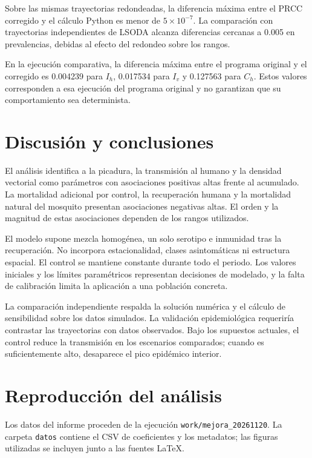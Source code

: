\documentclass[12pt,spanish,oneside,openany]{MastersDoctoralThesis}
\numberwithin{equation}{section}
\begin{document}
Sobre las mismas trayectorias redondeadas, la diferencia máxima entre el PRCC corregido y el cálculo Python es menor de $5\times10^{-7}$. La comparación con trayectorias independientes de LSODA alcanza diferencias cercanas a 0.005 en prevalencias, debidas al efecto del redondeo sobre los rangos.

En la ejecución comparativa, la diferencia máxima entre el programa original y el corregido es 0.004239 para $I_h$, 0.017534 para $I_v$ y 0.127563 para $C_h$. Estos valores corresponden a esa ejecución del programa original y no garantizan que su comportamiento sea determinista.

\clearpage
\section{Discusión y conclusiones}
El análisis identifica a la picadura, la transmisión al humano y la densidad vectorial como parámetros con asociaciones positivas altas frente al acumulado. La mortalidad adicional por control, la recuperación humana y la mortalidad natural del mosquito presentan asociaciones negativas altas. El orden y la magnitud de estas asociaciones dependen de los rangos utilizados.

El modelo supone mezcla homogénea, un solo serotipo e inmunidad tras la recuperación. No incorpora estacionalidad, clases asintomáticas ni estructura espacial. El control se mantiene constante durante todo el periodo. Los valores iniciales y los límites paramétricos representan decisiones de modelado, y la falta de calibración limita la aplicación a una población concreta.

La comparación independiente respalda la solución numérica y el cálculo de sensibilidad sobre los datos simulados. La validación epidemiológica requeriría contrastar las trayectorias con datos observados. Bajo los supuestos actuales, el control reduce la transmisión en los escenarios comparados; cuando es suficientemente alto, desaparece el pico epidémico interior.

\clearpage
{}



\clearpage
\section*{Reproducción del análisis}
Los datos del informe proceden de la ejecución \texttt{work/mejora\_20261120}. La carpeta \texttt{datos} contiene el CSV de coeficientes y los metadatos; las figuras utilizadas se incluyen junto a las fuentes LaTeX.
\end{document}
